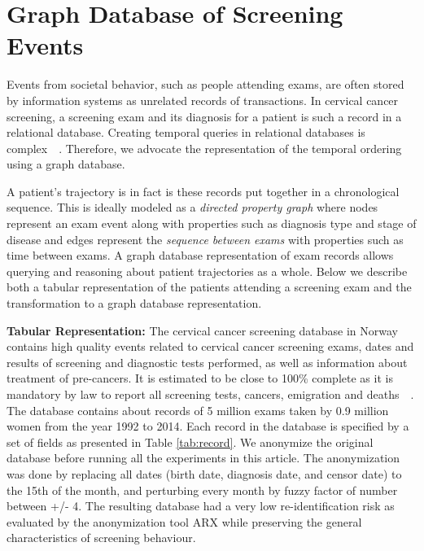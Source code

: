 \documentclass[10pt, conference]{IEEEtran}
\begin{document}
\section{Graph Database of Screening Events}
\label{sec:graph}

Events from societal behavior, such as people attending exams, are often stored by information systems as unrelated records of transactions. In cervical cancer screening, a screening exam and its diagnosis for a patient is such a record in a relational database. Creating temporal queries in relational databases is complex~\cite{COQUITO}~\cite{TQUEL}. Therefore, we advocate the representation of the temporal ordering using a graph database.

A patient's trajectory is in fact is these records put together in a chronological sequence. This is ideally modeled as a \emph{directed property graph} where nodes represent an exam event along with properties such as diagnosis type and stage of disease and edges represent the \emph{sequence between exams} with properties such as time between exams. A graph database representation of exam records allows querying and reasoning about patient trajectories as a whole. Below we describe both a tabular representation of the patients attending a screening exam and the transformation to a graph database representation. 

\noindent \textbf{Tabular Representation:} The cervical cancer screening  database in Norway contains high quality  events related to cervical cancer screening exams, dates and results of screening and diagnostic tests performed, as well as information about treatment of pre-cancers. It is estimated to be close to 100\% complete as it is mandatory by law to report all screening tests, cancers, emigration and deaths~\cite{NorwegianCancerRegistry1}~\cite{NorwegianCancerRegistry2}. The database contains about records of 5 million exams taken by 0.9 million women from the year 1992 to 2014. Each record in the database is specified by a set of fields as presented in Table \ref{tab:record}. We anonymize the original database before running all the experiments in this article.  The anonymization was done by replacing all dates (birth date, diagnosis date, and censor date) to the 15th of the month, and perturbing every month by fuzzy factor of number between +/- 4. The resulting database had a very low re-identification risk as evaluated by the anonymization tool ARX\cite{prasser2014arx} while preserving the general characteristics of screening behaviour.
\end{document}

